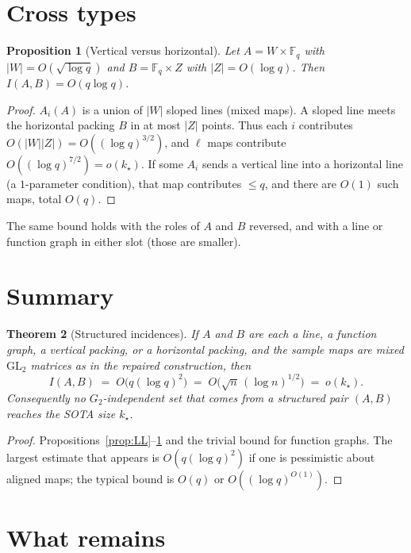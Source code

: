 \documentclass[11pt]{article}
\newtheorem{theorem}{Theorem}
\newtheorem{proposition}[theorem]{Proposition}
\theoremstyle{definition}
\newcommand{\F}{\mathbb{F}}
\begin{document}
\section{Cross types}

\begin{proposition}[Vertical versus horizontal]\label{prop:VH}
Let $A=W\times\F_q$ with $|W|=O(\sqrt{\log q})$ and $B=\F_q\times Z$ with $|Z|=O(\log q)$.
Then $I(A,B)=O(q\log q)$.
\end{proposition}

\begin{proof}
$A_i(A)$ is a union of $|W|$ sloped lines (mixed maps).
A sloped line meets the horizontal packing $B$ in at most $|Z|$ points.
Thus each $i$ contributes $O(|W||Z|)=O((\log q)^{3/2})$,
and $\ell$ maps contribute $O((\log q)^{7/2})=o(k_{\star})$.
If some $A_i$ sends a vertical line into a horizontal line (a $1$-parameter condition), that map contributes $\le q$, and there are $O(1)$ such maps, total $O(q)$.
\end{proof}

The same bound holds with the roles of $A$ and $B$ reversed, and with a line or function graph in either slot (those are smaller).

\section{Summary}

\begin{theorem}[Structured incidences]\label{thm:struct-inc}
If $A$ and $B$ are each a line, a function graph, a vertical packing, or a horizontal packing, and the sample maps are mixed $\mathrm{GL}_2$ matrices as in the repaired construction, then
\[
  I(A,B)\;=\;O\bigl(q(\log q)^{2}\bigr)\;=\;O\bigl(\sqrt{n}\,(\log n)^{1/2}\bigr)
  \;=\;o(k_{\star}).
\]
Consequently no $G_2$-independent set that comes from a structured pair $(A,B)$ reaches the SOTA size $k_{\star}$.
\end{theorem}

\begin{proof}
Propositions~\ref{prop:LL}--\ref{prop:VH} and the trivial bound for function graphs.
The largest estimate that appears is $O(q(\log q)^{2})$ if one is pessimistic about aligned maps; the typical bound is $O(q)$ or $O((\log q)^{O(1)})$.
\end{proof}

\section{What remains}
\end{document}
